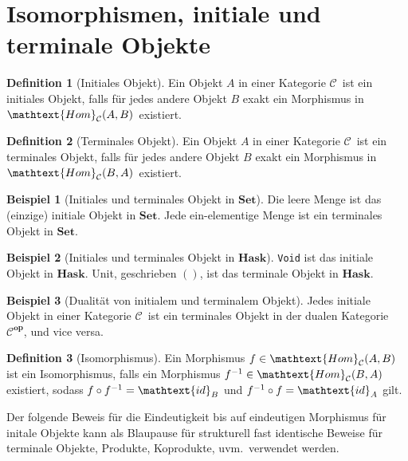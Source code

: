 \documentclass[10pt,twoside,openright]{memoir}
\theoremstyle{definition}
\newtheorem{definition}{Definition}
\newtheorem{beispiel}{Beispiel}
\newcommand{\C}{\ensuremath{\mathcal{C}}}
\newcommand{\Hom}[3]{\ensuremath{\mathtext{Hom}_{#1}(#2, #3)}}
\newcommand{\id}[1]{\ensuremath{\mathtext{id}_{#1}}}
\newcommand{\Set}{\ensuremath{\mathbf{Set}}}
\newcommand{\Hask}{\ensuremath{\mathbf{Hask}}}
\newcommand{\Op}[1]{\ensuremath{#1^{\mathbf{op}}}}
\begin{document}
\section{Isomorphismen, initiale und terminale Objekte}

\begin{definition}[Initiales Objekt]
  Ein Objekt $A$ in einer Kategorie \C\ ist ein initiales Objekt, falls für jedes andere Objekt $B$ exakt ein Morphismus in \Hom{\C}{A}{B}\ existiert.
\end{definition}

\begin{definition}[Terminales Objekt]
  Ein Objekt $A$ in einer Kategorie \C\ ist ein terminales Objekt, falls für jedes andere Objekt $B$ exakt ein Morphismus in \Hom{\C}{B}{A}\ existiert.
\end{definition}

\begin{beispiel}[Initiales und terminales Objekt in \Set]
  Die leere Menge ist das (einzige) initiale Objekt in \Set.
  Jede ein-elementige Menge ist ein terminales Objekt in \Set.
\end{beispiel}

\begin{beispiel}[Initiales und terminales Objekt in \Hask]
  \texttt{Void} ist das initiale Objekt in \Hask. Unit, geschrieben $()$, ist das terminale Objekt in \Hask.
\end{beispiel}

\begin{beispiel}[Dualität von initialem und terminalem Objekt]
  Jedes initiale Objekt in einer Kategorie \C\ ist ein terminales Objekt in der dualen Kategorie \Op{\C}, und vice versa.
\end{beispiel}
  
\begin{definition}[Isomorphismus]
  Ein Morphismus $f \in \Hom{\C}{A}{B}$ ist ein Isomorphismus, falls ein Morphismus $f^{-1} \in \Hom{\C}{B}{A}$ existiert, sodass $f \circ f^{-1} = \id{B}$ und $f^{-1} \circ f = \id{A}$ gilt.
\end{definition}

Der folgende Beweis für die Eindeutigkeit bis auf eindeutigen Morphismus für initale Objekte kann als Blaupause für strukturell fast identische Beweise für terminale Objekte, Produkte, Koprodukte, uvm.\ verwendet werden.
\end{document}
